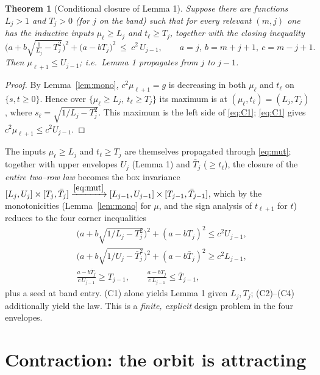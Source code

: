 \documentclass[11pt]{article}
\newtheorem{theorem}{Theorem}
\theoremstyle{definition}
\begin{document}
\begin{theorem}[Conditional closure of Lemma 1]\label{thm:C1}
Suppose there are functions $L_j>1$ and $T_j>0$ (for $j$ on the band) such that
for every relevant $(m,j)$ one has the inductive inputs $\mu_\ell\ge L_j$ and
$t_\ell\ge T_j$, together with the closing inequality
\begin{equation}\tag{C1}\label{eq:C1}
\Big(a+b\sqrt{\tfrac{1}{L_j}-T_j^2}\Big)^2+\big(a-bT_j\big)^2\ \le\ c^2\,U_{j-1},
\qquad a=j,\ b=m+j+1,\ c=m-j+1 .
\end{equation}
Then $\mu_{\ell+1}\le U_{j-1}$; i.e.\ Lemma 1 propagates from $j$ to $j-1$.
\end{theorem}

\begin{proof}
By Lemma~\ref{lem:mono}, $c^2\mu_{\ell+1}=g$ is decreasing in both $\mu_\ell$ and
$t_\ell$ on $\{s,t\ge0\}$. Hence over $\{\mu_\ell\ge L_j,\ t_\ell\ge T_j\}$ its
maximum is at $(\mu_\ell,t_\ell)=(L_j,T_j)$, where
$s_\ell=\sqrt{1/L_j-T_j^2}$. This maximum is the left side of \eqref{eq:C1};
\eqref{eq:C1} gives $c^2\mu_{\ell+1}\le c^2 U_{j-1}$.
\end{proof}

The inputs $\mu_\ell\ge L_j$ and $t_\ell\ge T_j$ are themselves propagated
through \eqref{eq:mut}; together with upper envelopes $U_j$ (Lemma 1) and
$\bar T_j$ ($\ge t_\ell$), the closure of the \emph{entire two--row law} becomes
the box invariance $[L_j,U_j]\times[T_j,\bar T_j]\xrightarrow{\eqref{eq:mut}}
[L_{j-1},U_{j-1}]\times[T_{j-1},\bar T_{j-1}]$, which by the monotonicities
(Lemma~\ref{lem:mono} for $\mu$, and the sign analysis of $t_{\ell+1}$ for $t$)
reduces to the four corner inequalities
\begin{align}
\tag{C1}&\big(a+b\sqrt{1/L_j-T_j^2}\big)^2+(a-bT_j)^2\le c^2U_{j-1},\\
\tag{C2}&\big(a+b\sqrt{1/U_j-\bar T_j^2}\big)^2+(a-b\bar T_j)^2\ge c^2L_{j-1},\\
\tag{C3}&\frac{a-b\bar T_j}{c\,U_{j-1}}\ge T_{j-1},\qquad
\tag{C4}\frac{a-bT_j}{c\,L_{j-1}}\le \bar T_{j-1},
\end{align}
plus a seed at band entry. (C1) alone yields Lemma 1 given $L_j,T_j$; (C2)--(C4)
additionally yield the law. This is a \emph{finite, explicit} design problem in
the four envelopes.

\section{Contraction: the orbit is attracting}
\end{document}
